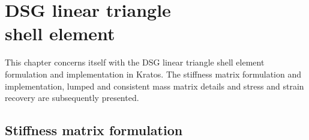 





\setcounter{MaxMatrixCols}{20}




\chapter[DSG linear triangle shell element]{DSG linear triangle \\ shell element}
\label{chap:chapter_3}

\renewcommand{\Thema}{DSG linear triangle shell element}

This chapter concerns itself with the DSG linear triangle shell element formulation and implementation in Kratos. The stiffness matrix formulation and implementation, lumped and consistent mass matrix details and stress and strain recovery are subsequently presented.

\section{Stiffness matrix formulation}

